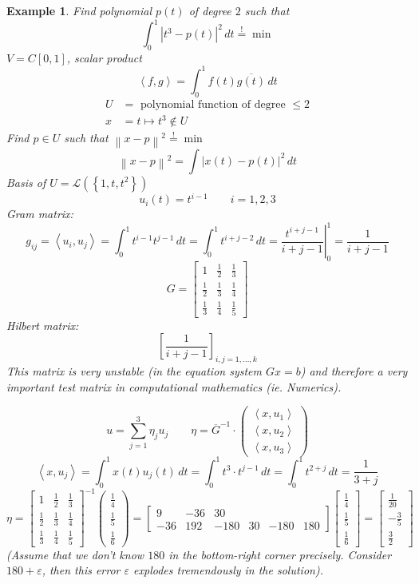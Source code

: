 \documentclass[a4paper]{article}
\newcounter{lecref}[section]
\numberwithin{lecref}{section}
\newtheorem{example}[lecref]{Example}
\newcommand{\set}[1]{\left\{#1\right\}}
\newcommand{\ip}[2]{\left\langle#1,#2\right\rangle} %
\newcommand{\norm}[1]{\left\|#1\right\|}
\newcommand{\card}[1]{\left|#1\right|}
\begin{document}
\begin{example} %
  \label{ex855}
  Find polynomial $p(t)$ of degree $2$ such that
  \[ \int_0^1 \card{t^3 - p(t)}^2 \, dt \overset!= \min \]
  $V = C[0,1]$, scalar product
  \[ \ip{f}{g} = \int_0^1 f(t) \overline{g(t)} \, dt \]
  \begin{align*}
    U &= \text{ polynomial function of degree } \leq 2 \\
    x &= t \mapsto t^3 \not\in U
  \end{align*}
  Find $p \in U$ such that $\norm{x - p}^2 \overset!= \min$
  \[ \norm{x - p}^2 = \int \card{x(t) - p(t)}^2 \, dt \]
  Basis of $U = \mathcal L(\set{1, t, t^2})$
  \[ u_i(t) = t^{i-1} \qquad i = 1,2,3 \]
  Gram matrix:
  \[ g_{ij} = \ip{u_i}{u_j} = \int_0^1 t^{i-1} t^{j-1} \, dt = \int_0^1 t^{i+j-2} \, dt = \left. \frac{t^{i+j-1}}{i + j - 1} \right|_0^1 = \frac{1}{i + j - 1} \]
  \[
    G = \begin{bmatrix}
      1 & \frac12 & \frac13 \\
      \frac12 & \frac13 & \frac14 \\
      \frac13 & \frac14 & \frac15
    \end{bmatrix}
  \]
  Hilbert matrix:
  \[ \left[\frac{1}{i+j-1}\right]_{i,j=1,\ldots,k} \]
  This matrix is very unstable (in the equation system $Gx = b$) and therefore a very important test matrix in computational mathematics (ie. Numerics).

  \[ u = \sum_{j=1}^3 \eta_j u_j \qquad \eta = \overline{G}^{-1} \cdot \begin{pmatrix} \ip{x}{u_1} \\ \ip{x}{u_2} \\ \ip{x}{u_3} \end{pmatrix} \]
  \[ \ip{x}{u_j} = \int_0^1 x(t) u_j(t) \, dt = \int_0^1 t^3 \cdot t^{j-1} \, dt = \int_0^1 t^{2 + j} \, dt = \frac{1}{3 + j} \]
  \[
    \eta = \begin{bmatrix} 1 & \frac12 & \frac13 \\ \frac12 & \frac13 & \frac14 \\ \frac13 & \frac14 & \frac15 \end{bmatrix}^{-1}
    \begin{pmatrix} \frac14 \\ \frac15 \\ \frac16 \end{pmatrix}
    = \begin{bmatrix} 9 & -36 & 30 \\ -36 & 192 & -180 & 30 & -180 & 180 \end{bmatrix}
    \begin{bmatrix} \frac14 \\ \frac15 \\ \frac16 \end{bmatrix}
    = \begin{bmatrix} \frac1{20} \\ -\frac35 \\ \frac32 \end{bmatrix}
  \]
  (Assume that we don't know $180$ in the bottom-right corner precisely. Consider $180+\varepsilon$, then this error $\varepsilon$ explodes tremendously in the solution).
\end{example}
\end{document}

